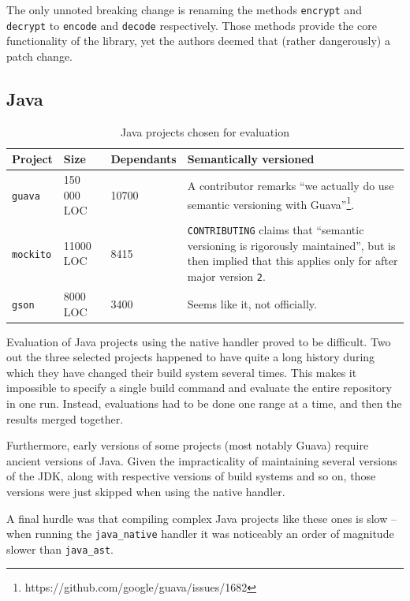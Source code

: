 \documentclass{l4proj}
\newcommand\genericstyle{\lstset{basicstyle=\ttm}}
\newcommand\codeinline[1]{{\genericstyle\lstinline!#1!}}
\begin{document}
The only unnoted breaking change is renaming the methods
\codeinline{encrypt} and \codeinline{decrypt} to \codeinline{encode}
and \codeinline{decode} respectively. Those methods provide the core
functionality of the library, yet the authors deemed that (rather
dangerously) a patch change.

\subsection{Java}

\begin{table}[H]
\centering
\caption{Java projects chosen for evaluation}
\label{JavaProjectsForEvaluation}
\begin{tabular}{|l|l|l|p{10cm}|}
\hline
\textbf{Project} & \textbf{Size} & \textbf{Dependants}
& \textbf{Semantically versioned} \\
\hline
\codeinline{guava} & 150 000 LOC & 10700 & A contributor remarks ``we
actually do use semantic versioning with
Guava''\footnote{https://github.com/google/guava/issues/1682}. \\
\codeinline{mockito} & 11000 LOC & 8415 & \codeinline{CONTRIBUTING}
claims that ``semantic versioning is rigorously maintained'', but is
then implied that this applies only for after major version
\codeinline{2}. \\
\codeinline{gson} & 8000 LOC & 3400 & Seems like it, not officially. \\
\hline
\end{tabular}
\end{table}

Evaluation of Java projects using the native handler proved to be difficult.
Two out the three selected projects happened to have quite a long
history during which they have changed their build system several
times. This makes it impossible to specify a single build command and
evaluate the entire repository in one run. Instead, evaluations had to
be done one range at a time, and then the results merged together.

Furthermore, early versions of some projects (most notably Guava)
require ancient versions of Java. Given the impracticality of
maintaining several versions of the JDK, along with respective
versions of build systems and so on, those versions were just skipped
when using the native handler.

A final hurdle was that compiling complex Java projects like these
ones is slow -- when running the \codeinline{java_native} handler it
was noticeably an order of magnitude slower than \codeinline{java_ast}.
\end{document}
